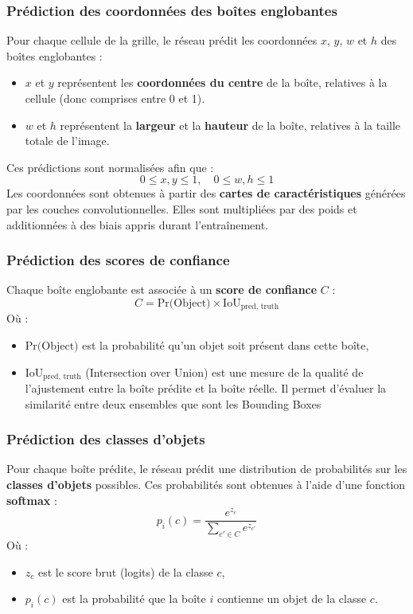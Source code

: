 \documentclass[a4paper,12pt]{article}
\begin{document}
\subsubsection{Prédiction des coordonnées des boîtes englobantes}
Pour chaque cellule de la grille, le réseau prédit les coordonnées \(x\), \(y\), \(w\) et \(h\) des boîtes englobantes :
\begin{itemize}
    \item \( x \) et \( y \) représentent les \textbf{coordonnées du centre} de la boîte, relatives à la cellule (donc comprises entre 0 et 1).
    \item \( w \) et \( h \) représentent la \textbf{largeur} et la \textbf{hauteur} de la boîte, relatives à la taille totale de l'image.
\end{itemize}

Ces prédictions sont normalisées afin que :
\[
0 \leq x, y \leq 1, \quad 0 \leq w, h \leq 1
\]
Les coordonnées sont obtenues à partir des \textbf{cartes de caractéristiques} générées par les couches convolutionnelles. Elles sont multipliées par des poids et additionnées à des biais appris durant l'entraînement.

\subsubsection{Prédiction des scores de confiance}
Chaque boîte englobante est associée à un \textbf{score de confiance} \(C\) :
\[
C = \text{Pr(Object)} \times \text{IoU}_{\text{pred, truth}}
\]
Où :
\begin{itemize}
    \item \( \text{Pr(Object)} \) est la probabilité qu'un objet soit présent dans cette boîte,
    \item \( \text{IoU}_{\text{pred, truth}} \) (Intersection over Union) est une mesure de la qualité de l'ajustement entre la boîte prédite et la boîte réelle. Il permet d'évaluer la similarité entre deux ensembles que sont les Bounding Boxes
\end{itemize}

\subsubsection{Prédiction des classes d'objets}
Pour chaque boîte prédite, le réseau prédit une distribution de probabilités sur les \textbf{classes d'objets} possibles. Ces probabilités sont obtenues à l'aide d'une fonction \textbf{softmax} :
\[
p_i(c) = \frac{e^{z_c}}{\sum_{c' \in C} e^{z_{c'}}}
\]
Où :
\begin{itemize}
    \item \( z_c \) est le score brut (logits) de la classe \(c\),
    \item \( p_i(c) \) est la probabilité que la boîte \(i\) contienne un objet de la classe \(c\).
\end{itemize}
\end{document}
